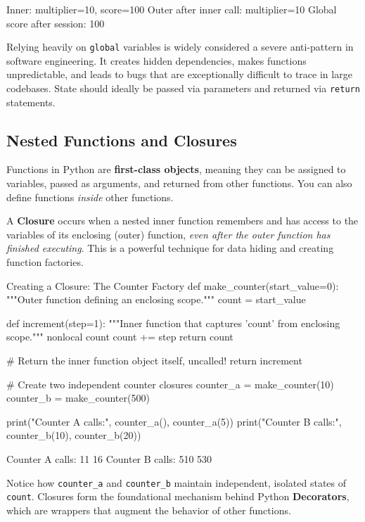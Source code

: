 \begin{outputbox}
Inner: multiplier=10, score=100
Outer after inner call: multiplier=10
Global score after session: 100
\end{outputbox}

Relying heavily on \texttt{global} variables is widely considered a severe anti-pattern in software engineering. It creates hidden dependencies, makes functions unpredictable, and leads to bugs that are exceptionally difficult to trace in large codebases. State should ideally be passed via parameters and returned via \texttt{return} statements.

\subsection{Nested Functions and Closures}
Functions in Python are \textbf{first-class objects}, meaning they can be assigned to variables, passed as arguments, and returned from other functions. You can also define functions \textit{inside} other functions.

A \textbf{Closure} occurs when a nested inner function remembers and has access to the variables of its enclosing (outer) function, \textit{even after the outer function has finished executing}. This is a powerful technique for data hiding and creating function factories.

\begin{pythoncode}{Creating a Closure: The Counter Factory}
def make_counter(start_value=0):
    """Outer function defining an enclosing scope."""
    count = start_value
    
    def increment(step=1):
        """Inner function that captures 'count' from enclosing scope."""
        nonlocal count
        count += step
        return count
        
    # Return the inner function object itself, uncalled!
    return increment

# Create two independent counter closures
counter_a = make_counter(10)
counter_b = make_counter(500)

print("Counter A calls:", counter_a(), counter_a(5))
print("Counter B calls:", counter_b(10), counter_b(20))
\end{pythoncode}

\begin{outputbox}
Counter A calls: 11 16
Counter B calls: 510 530
\end{outputbox}
Notice how \texttt{counter\_a} and \texttt{counter\_b} maintain independent, isolated states of \texttt{count}. Closures form the foundational mechanism behind Python \textbf{Decorators}, which are wrappers that augment the behavior of other functions.

